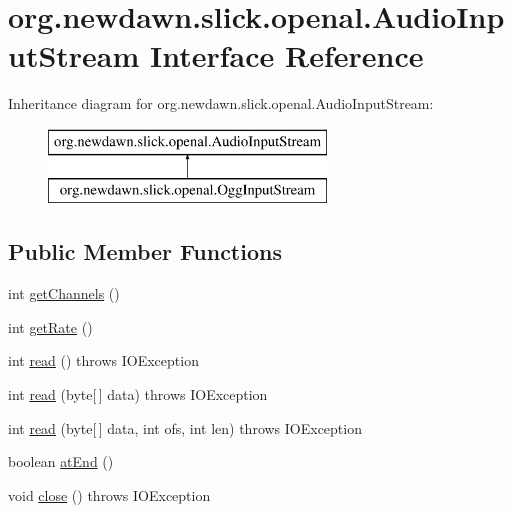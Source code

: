 \hypertarget{interfaceorg_1_1newdawn_1_1slick_1_1openal_1_1_audio_input_stream}{}\section{org.\+newdawn.\+slick.\+openal.\+Audio\+Input\+Stream Interface Reference}
\label{interfaceorg_1_1newdawn_1_1slick_1_1openal_1_1_audio_input_stream}
Inheritance diagram for org.\+newdawn.\+slick.\+openal.\+Audio\+Input\+Stream\+:\begin{figure}[H]
\begin{center}
\leavevmode
\includegraphics[height=2.000000cm]{interfaceorg_1_1newdawn_1_1slick_1_1openal_1_1_audio_input_stream}
\end{center}
\end{figure}
\subsection*{Public Member Functions}
\begin{DoxyCompactItemize}
\item 
int \mbox{\hyperlink{interfaceorg_1_1newdawn_1_1slick_1_1openal_1_1_audio_input_stream_a2bee5322dd7878c18fa8f16bd52bbdfa}{get\+Channels}} ()
\item 
int \mbox{\hyperlink{interfaceorg_1_1newdawn_1_1slick_1_1openal_1_1_audio_input_stream_a461c4ad4304ff8d75693c93e525e0f85}{get\+Rate}} ()
\item 
int \mbox{\hyperlink{interfaceorg_1_1newdawn_1_1slick_1_1openal_1_1_audio_input_stream_a4e9ee99faa0551bca581a985e262d619}{read}} ()  throws I\+O\+Exception
\item 
int \mbox{\hyperlink{interfaceorg_1_1newdawn_1_1slick_1_1openal_1_1_audio_input_stream_a1e8c74e2bc52725377b2b859da92a4af}{read}} (byte\mbox{[}$\,$\mbox{]} data)  throws I\+O\+Exception
\item 
int \mbox{\hyperlink{interfaceorg_1_1newdawn_1_1slick_1_1openal_1_1_audio_input_stream_abdaf21295b97e38b8cb70a651c22d553}{read}} (byte\mbox{[}$\,$\mbox{]} data, int ofs, int len)  throws I\+O\+Exception
\item 
boolean \mbox{\hyperlink{interfaceorg_1_1newdawn_1_1slick_1_1openal_1_1_audio_input_stream_af2234c4714c7ee9c4cecde2969f2f4b7}{at\+End}} ()
\item 
void \mbox{\hyperlink{interfaceorg_1_1newdawn_1_1slick_1_1openal_1_1_audio_input_stream_a2b70decb677f0cc88365a689f4953eeb}{close}} ()  throws I\+O\+Exception
\end{DoxyCompactItemize}


